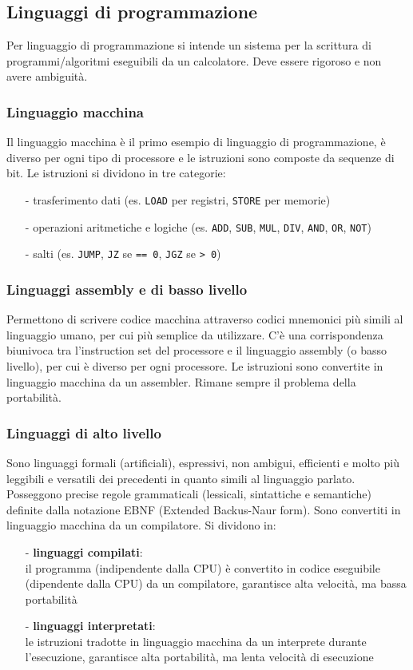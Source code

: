 \documentclass[a4paper]{article}
\begin{document}
\subsection{Linguaggi di programmazione}
Per linguaggio di programmazione si intende un sistema per la scrittura di programmi/algoritmi eseguibili da un calcolatore.
Deve essere rigoroso e non avere ambiguità.

\subsubsection*{Linguaggio macchina}
Il linguaggio macchina è il primo esempio di linguaggio di programmazione, è diverso per ogni tipo di processore e le
istruzioni sono composte da sequenze di bit. Le istruzioni si dividono in tre categorie:
\begin{itemize}[topsep=3pt, itemsep=0pt]
	\item[-] trasferimento dati (es. \verb|LOAD| per registri, \verb|STORE| per memorie)
	\item[-] operazioni aritmetiche e logiche (es. \verb|ADD|, \verb|SUB|, \verb|MUL|, \verb|DIV|, \verb|AND|, \verb|OR|, \verb|NOT|)
	\item[-] salti (es. \verb|JUMP|, \verb|JZ| se \verb|== 0|, \verb|JGZ| se \verb|> 0|)
\end{itemize}

\subsubsection*{Linguaggi assembly e di basso livello}
Permettono di scrivere codice macchina attraverso codici mnemonici più simili al linguaggio umano, per cui più semplice
da utilizzare. C'è una corrispondenza biunivoca tra l'instruction set del processore e il linguaggio assembly (o basso
livello), per cui è diverso per ogni processore. Le istruzioni sono convertite in linguaggio macchina da un assembler.
Rimane sempre il problema della portabilità.

\subsubsection*{Linguaggi di alto livello}
Sono linguaggi formali (artificiali), espressivi, non ambigui, efficienti e molto più leggibili e versatili dei precedenti
in quanto simili al linguaggio parlato. Posseggono precise regole grammaticali (lessicali, sintattiche e semantiche) definite
dalla notazione EBNF (Extended Backus-Naur form). Sono convertiti in linguaggio macchina da un compilatore. Si dividono in:
\begin{itemize}[topsep=3pt, itemsep=0pt]
	\item[-] \textbf{linguaggi compilati}: \\
	il programma (indipendente dalla CPU) è convertito in codice eseguibile (dipendente dalla CPU) da un compilatore,
	garantisce alta velocità, ma bassa portabilità
	\item[-] \textbf{linguaggi interpretati}: \\
	le istruzioni tradotte in linguaggio macchina da un interprete durante l'esecuzione, garantisce alta portabilità,
	ma lenta velocità di esecuzione
\end{itemize}
\end{document}
